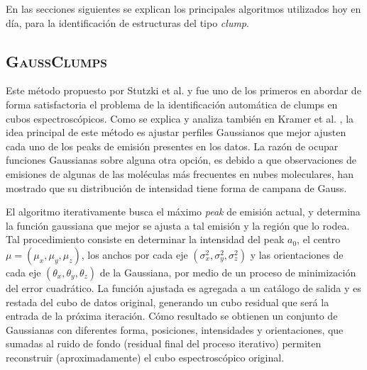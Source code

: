 \documentclass[letter, 11pt]{article}
\begin{document}
En las secciones siguientes se explican los principales algoritmos utilizados hoy en día, para la identificación de estructuras del tipo \textit{clump}.


\subsection{\textsc{GaussClumps}}
Este método propuesto por Stutzki et al. \cite{Stutzki} y fue uno de los primeros en abordar de forma satisfactoria el problema de la identificación automática de clumps en cubos espectroscópicos. Como se explica y analiza también en Kramer et al. \cite{Kramer}, la idea principal de este método es ajustar perfiles Gaussianos que mejor ajusten cada uno de los peaks de emisión presentes en los datos. La razón de ocupar funciones Gaussianas sobre alguna otra opción, es debido a que observaciones de emisiones de algunas de las moléculas más frecuentes en nubes moleculares, han mostrado que su distribución de intensidad tiene forma de campana de Gauss.

El algoritmo iterativamente busca el máximo \textit{peak} de emisión actual, y determina la función gaussiana que mejor se ajusta a tal emisión y la región que lo rodea. Tal procedimiento consiste en determinar la intensidad del peak $a_0$, el centro $\mu=(\mu_x, \mu_y, \mu_z)$, los anchos por cada eje $(\sigma_x^2, \sigma_y^2, \sigma_z^2)$ y las orientaciones de cada eje $(\theta_x, \theta_y, \theta_z)$ de la Gaussiana, por medio de un proceso de minimización del error cuadrático. La función ajustada es agregada a un catálogo de salida y es restada del cubo de datos original, generando un cubo residual que será la entrada de la próxima iteración. Cómo resultado se obtienen un conjunto de Gaussianas con diferentes forma, posiciones, intensidades y orientaciones, que sumadas al ruido de fondo (residual final del proceso iterativo) permiten reconstruir (aproximadamente) el cubo espectroscópico original.
\end{document}
